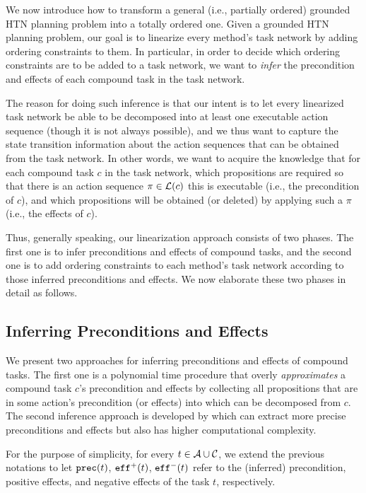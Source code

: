 We now introduce how to transform a general (i.e., partially ordered) grounded HTN planning problem into a totally ordered one. Given a grounded HTN planning problem, our goal is to linearize every method's task network by adding ordering constraints to them. In particular, in order to decide which ordering constraints are to be added to a task network, we want to \emph{infer} the precondition and effects of each compound task in the task network. %

The reason for doing such inference is that our intent is to let every linearized task network be able to be decomposed into at least one executable action sequence (though it is not always possible), and we thus want to capture the state transition information about the action sequences that can be obtained from the task network. In other words, we want to acquire the knowledge that for each compound task $c$ in the task network, which propositions are required so that there is an action sequence $\pi \in \mathcal{L}(c)$ this is executable (i.e., the precondition of $c$), and which propositions will be obtained (or deleted) by applying such a $\pi$ (i.e., the effects of $c$). %

Thus, generally speaking, our linearization approach consists of two phases. The first one is to infer preconditions and effects of compound tasks, and the second one is to add ordering constraints to each method's task network according to those inferred preconditions and effects. We now elaborate these two phases in detail as follows.

\subsection{Inferring Preconditions and Effects}
We present two approaches for inferring preconditions and effects of compound tasks. The first one is a polynomial time procedure that overly \emph{approximates} a compound task $c$'s precondition and effects by collecting all propositions that are in some action's precondition (or effects) into which can be decomposed from $c$. The second inference approach is developed by  which can extract more precise preconditions and effects but also has higher computational complexity. 

For the purpose of simplicity, for every $t \in \mathcal{A}{} \cup \mathcal{C}{}$, we extend the previous notations to let $\mathtt{prec}(t)$, $\mathtt{eff}^{+}(t)$, $\mathtt{eff}^{-}(t)$ refer to the (inferred) precondition, positive effects, and negative effects of the task $t$, respectively.


